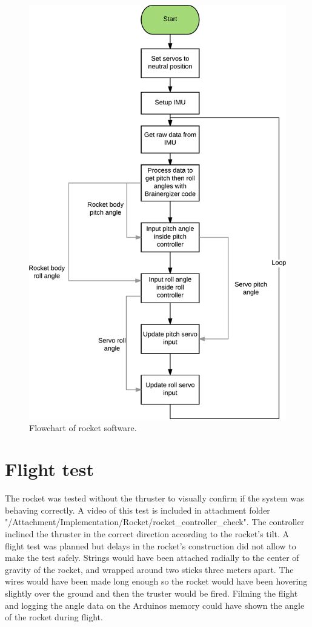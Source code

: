 \begin{figure}[htbp]
	\centering
	\includegraphics[width=0.6\linewidth]{figures/Rocket/implementation/FlowRocket}
	\caption{Flowchart of rocket software.}
	\label{fig:igniter_board}
\end{figure}

\newpage
\section{Flight test}
The rocket was tested without the thruster to visually confirm if the system was behaving correctly. A video of this test is included in attachment folder "/Attachment/Implementation/Rocket/rocket_controller_check". The controller inclined the thruster in the correct direction according to the rocket's tilt. A flight test was planned but delays in the rocket's construction did not allow to make the test safely.
Strings would have been attached radially to the center of gravity of the rocket, and wrapped around two sticks three meters apart. The wires would have been made long enough so the rocket would have been hovering slightly over the ground and then the truster would be fired. Filming the flight and logging the angle data on the Arduinos memory could have shown the angle of  the rocket during flight.